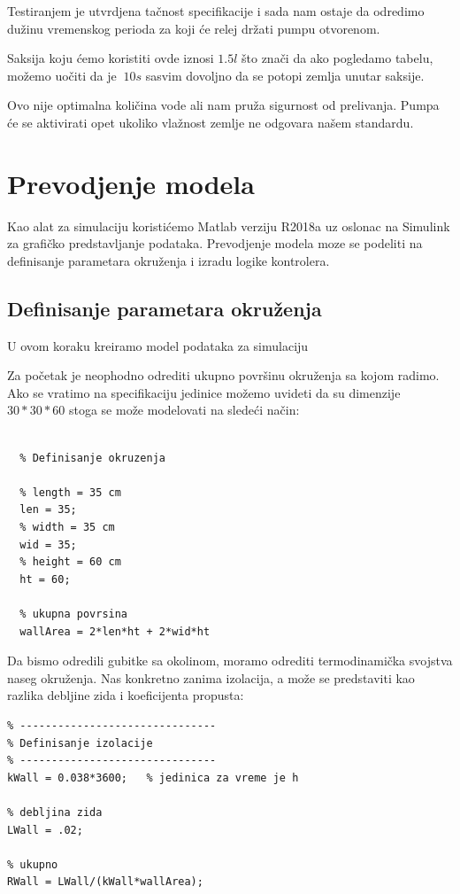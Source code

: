 \documentclass[a4paper,11pt]{book}
\begin{document}
Testiranjem je utvrdjena tačnost specifikacije i sada nam ostaje da odredimo dužinu vremenskog perioda za koji će relej držati pumpu otvorenom.

Saksija koju ćemo koristiti ovde iznosi $1.5l$ što znači da ako pogledamo tabelu, možemo uočiti da je $~10s$ sasvim dovoljno da se potopi zemlja unutar saksije.

Ovo nije optimalna količina vode ali nam pruža sigurnost od prelivanja. Pumpa će se aktivirati opet ukoliko vlažnost zemlje ne odgovara našem standardu.

\section{Prevodjenje modela}

Kao alat za simulaciju koristićemo Matlab verziju R2018a uz oslonac na Simulink za grafičko predstavljanje podataka. Prevodjenje modela moze se podeliti na definisanje parametara okruženja i izradu logike kontrolera. 

\subsection{Definisanje parametara okruženja}

U ovom koraku kreiramo model podataka za simulaciju

Za početak je neophodno odrediti ukupno površinu okruženja sa kojom radimo. Ako se vratimo na specifikaciju jedinice možemo uvideti da su dimenzije $30*30*60$ stoga se može modelovati na sledeći način:

\begin{lstlisting}

  % Definisanje okruzenja

  % length = 35 cm
  len = 35;
  % width = 35 cm
  wid = 35;
  % height = 60 cm
  ht = 60;

  % ukupna povrsina
  wallArea = 2*len*ht + 2*wid*ht
  \end{lstlisting}

Da bismo odredili gubitke sa okolinom, moramo odrediti termodinamička svojstva naseg okruženja. Nas konkretno zanima izolacija, a može se predstaviti kao razlika debljine zida i koeficijenta propusta:\\

\begin{lstlisting}
% -------------------------------
% Definisanje izolacije
% -------------------------------
kWall = 0.038*3600;   % jedinica za vreme je h

% debljina zida
LWall = .02;

% ukupno
RWall = LWall/(kWall*wallArea);
\end{lstlisting}
\end{document}
